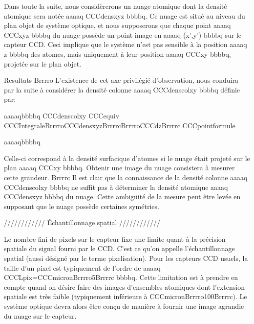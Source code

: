 Dans toute la suite, nous considèrerons un nuage atomique dont la densité atomique sera notée aaaaq CCCdensxyz bbbbq. Ce nuage est situé au niveau du plan objet de système optique, et nous supposerons que chaque point aaaaq CCCxyz bbbbq du nuage possède un point image en aaaaq (x',y') bbbbq sur le capteur CCD. 
Ceci implique que le système n'est pas sensible à la position aaaaq z bbbbq des atomes, mais uniquement à leur position aaaaq CCCxy bbbbq, projetée sur le plan objet.






Resultats
Brrrro
L'existence de cet axe privilégié d'observation, nous conduira par la suite à considérer la densité colonne aaaaq CCCdenscolxy bbbbq définie par:


aaaaqbbbbq
	CCCdenscolxy CCCequiv CCCIntegraleBrrrroCCCdensxyzBrrrrcBrrrroCCCdzBrrrrc
	CCCpointformule
	
aaaaqbbbbq



Celle-ci correspond à la densité surfacique d'atomes si le nuage était projeté sur le plan aaaaq CCCxy bbbbq. Obtenir une image du nuage consistera à mesurer cette grandeur.
Brrrrc
Il est clair que la connaissance de la densité colonne aaaaq CCCdenscolxy bbbbq ne suffit pas à déterminer la densité atomique aaaaq CCCdensxyz bbbbq du nuage. Cette ambigüité de la mesure peut être levée en supposant que le nuage possède certaines symétries.

//////////// Échantillonnage spatial ////////////

	Le nombre fini de pixels sur le capteur fixe une limite quant à la précision spatiale du signal fourni par le CCD. C'est ce qu'on appelle l'échantillonnage spatial (aussi désigné par le terme pixelisation). Pour les capteurs CCD usuels, la taille d'un pixel est typiquement de l'ordre de aaaaq CCCLpix=CCCmicronBrrrro5Brrrrc bbbbq. Cette limitation est à prendre en compte quand on désire faire des images d'ensembles atomiques dont l'extension spatiale est très faible (typiquement inférieure à CCCmicronBrrrro100Brrrrc). Le système optique devra alors être conçu de manière à fournir une image agrandie du nuage sur le capteur. 
	



